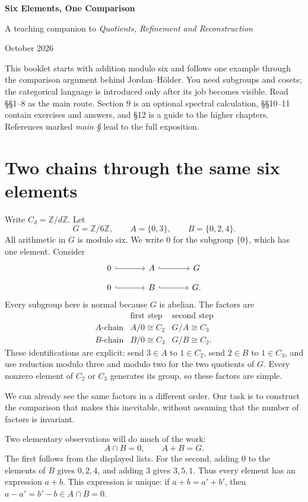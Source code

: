 \documentclass[11pt]{article}
\newcommand{\Z}{\mathbb Z}
\begin{document}
{\LARGE\bfseries Six Elements, One Comparison}\par
{\large A teaching companion to \emph{Quotients, Refinement and Reconstruction}}\par
{\small October 2026}

This booklet starts with addition modulo six and follows one example through
the comparison argument behind Jordan--Hölder. You need subgroups and cosets;
the categorical language is introduced only after its job becomes visible.
Read §§1--8 as the main route. Section 9 is an optional spectral calculation,
§§10--11 contain exercises and answers, and §12 is a guide to the higher chapters.
References marked \emph{main §} lead to the full exposition.

\section{Two chains through the same six elements}\label{c:chains}
Write \(C_d=\Z/d\Z\). Let
\[
 G=\Z/6\Z,\qquad A=\{0,3\},\qquad B=\{0,2,4\}.
\]
All arithmetic in \(G\) is modulo six. We write \(0\) for the subgroup
\(\{0\}\), which has one element. Consider
\[
\begin{tikzcd}[column sep=large,row sep=small]
0\arrow[r,hook]&A\arrow[r,hook]&G\\
0\arrow[r,hook]&B\arrow[r,hook]&G.
\end{tikzcd}
\]
Every subgroup here is normal because \(G\) is abelian. The factors are
\[
\begin{array}{c|cc}
 &\text{first step}&\text{second step}\\ \hline
 A\text{-chain}&A/0\cong C_2&G/A\cong C_3\\
 B\text{-chain}&B/0\cong C_3&G/B\cong C_2 .
\end{array}
\]
These identifications are explicit: send \(3\in A\) to \(1\in C_2\),
send \(2\in B\) to \(1\in C_3\), and use reduction modulo three and modulo
two for the two quotients of \(G\). Every nonzero element of \(C_2\) or
\(C_3\) generates its group, so these factors are simple.

We can already see the same factors in a different order. Our task is to
construct the comparison that makes this inevitable, without assuming that
the number of factors is invariant.

Two elementary observations will do much of the work:
\[
 A\cap B=0,\qquad A+B=G.
\]
The first follows from the displayed lists. For the second, adding \(0\) to
the elements of \(B\) gives \(0,2,4\), and adding \(3\) gives \(3,5,1\).
Thus every element has an expression \(a+b\). This expression is unique:
if \(a+b=a'+b'\), then \(a-a'=b'-b\in A\cap B=0\).
\end{document}
